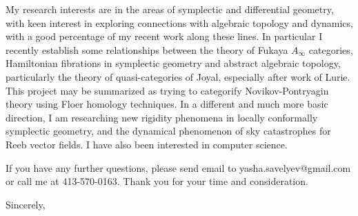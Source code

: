 \documentclass[12pt]{letter}
\begin{document}
\begin{letter}{
}
%

My research interests are in the areas of symplectic and differential geometry, 
with keen interest in exploring connections with algebraic topology and dynamics,  with a
good percentage of my recent work along these lines.  In particular I recently
establish some  relationships between the theory of Fukaya $A _{\infty} $
categories, Hamiltonian fibrations in symplectic geometry and abstract
algebraic topology, particularly the theory of quasi-categories of Joyal,
especially after work of Lurie. This project may be summarized as trying to categorify Novikov-Pontryagin theory using Floer homology techniques.
In a different and much more basic direction, I am researching new rigidity phenomena in locally conformally symplectic geometry, 
and the dynamical phenomenon of sky catastrophes for Reeb vector fields. I have also been interested in computer science.

 If
you have any further questions, please send email to 
{\sf yasha.savelyev@gmail.com} or call me at 413-570-0163. 
Thank you for your time and consideration.


\closing{Sincerely,} 


\end{letter}
\end{document}

